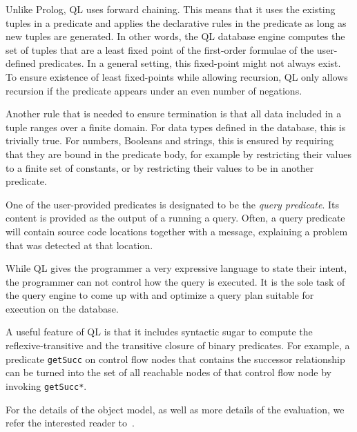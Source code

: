 Unlike Prolog, QL uses forward chaining.
This means that it uses the existing tuples in a predicate and applies the declarative
rules in the predicate as long as new tuples are generated.
In other words, the QL database engine computes the set of tuples that are a least fixed point 
of the first-order formulae of the user-defined predicates.
In a general setting, this fixed-point might not always exist.
To ensure existence of least fixed-points while allowing recursion,
QL only allows recursion if the predicate appears under an even number of negations.

Another rule that is needed to ensure termination is that all data included in a tuple 
ranges over a finite domain.
For data types defined in the database, this is trivially true.
For numbers, Booleans and strings, this is ensured by requiring that they are bound 
in the predicate body, for example by restricting their values to a finite set of constants,
or by restricting their values to be in another predicate.

One of the user-provided predicates is designated to be the \emph{query predicate}.
Its content is provided as the output of a running a query.
Often, a query predicate will contain source code locations together with a message,
explaining a problem that was detected at that location.

While QL gives the programmer a very expressive language to state their intent,
the programmer can not control how the query is executed.
It is the sole task of the query engine to come up with and optimize a 
query plan suitable for execution on the database.

A useful feature of QL is that it includes syntactic sugar to compute the reflexive-transitive
and the transitive closure of binary predicates.
For example, a predicate \texttt{getSucc} on control flow nodes that contains the 
successor relationship can be turned into the set of all reachable
nodes of that control flow node by invoking \texttt{getSucc*}.

For the details of the object model, as well as more details of the evaluation, we refer
the interested reader to~\cite{qlpaper}.

